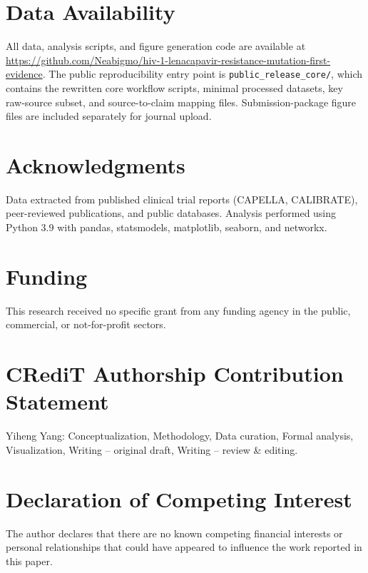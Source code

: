 \documentclass[preprint,authoryear]{elsarticle}
\begin{document}
\section*{Data Availability}
All data, analysis scripts, and figure generation code are available at \href{https://github.com/Neabigmo/hiv-1-lenacapavir-resistance-mutation-first-evidence}{https://github.com/Neabigmo/hiv-1-lenacapavir-resistance-mutation-first-evidence}. The public reproducibility entry point is \texttt{public\_release\_core/}, which contains the rewritten core workflow scripts, minimal processed datasets, key raw-source subset, and source-to-claim mapping files. Submission-package figure files are included separately for journal upload.

\section*{Acknowledgments}
Data extracted from published clinical trial reports (CAPELLA, CALIBRATE), peer-reviewed publications, and public databases. Analysis performed using Python 3.9 with pandas, statsmodels, matplotlib, seaborn, and networkx.

\section*{Funding}
This research received no specific grant from any funding agency in the public, commercial, or not-for-profit sectors.

\section*{CRediT Authorship Contribution Statement}
Yiheng Yang: Conceptualization, Methodology, Data curation, Formal analysis, Visualization, Writing -- original draft, Writing -- review \& editing.

\section*{Declaration of Competing Interest}
The author declares that there are no known competing financial interests or personal relationships that could have appeared to influence the work reported in this paper.
\end{document}
